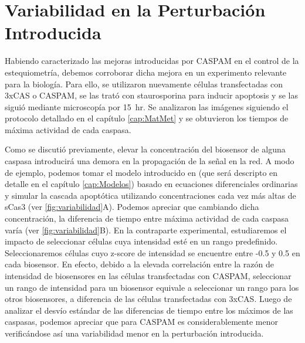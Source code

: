 \section{Variabilidad en la Perturbación Introducida}


Habiendo caracterizado las mejoras introducidas por CASPAM en el control de la estequiometría, debemos corroborar dicha mejora en un experimento relevante para la biología. Para ello, se utilizaron nuevamente células transfectadas con 3xCAS o CASPAM, se las trató con staurosporina para inducir apoptosis y se las siguió mediante microscopía por 15~hr. Se analizaron las imágenes siguiendo el protocolo detallado en el capítulo \ref{cap:MatMet} y se obtuvieron los tiempos de máxima actividad de cada caspasa.

Como se discutió previamente, elevar la concentración del biosensor de alguna caspasa introducirá una demora en la propagación de la señal en la red. A modo de ejemplo, podemos tomar el modelo introducido en \cite{Corbat2018} (que será descripto en detalle en el capítulo \ref{cap:Modelos}) basado en ecuaciones diferenciales ordinarias y simular la cascada apoptótica utilizando concentraciones cada vez más altas de sCas3 (ver \cref{fig:variabilidad}A). Podemos apreciar que cambiando dicha concentración, la diferencia de tiempo entre máxima actividad de cada caspasa varía (ver \cref{fig:variabilidad}B). En la contraparte experimental, estudiaremos el impacto de seleccionar células cuya intensidad esté en un rango predefinido. Seleccionaremos células cuyo z-score de intensidad se encuentre entre -0.5 y 0.5 en cada biosensor. En efecto, debido a la elevada correlación entre la razón de intensidad de biosensores en las células transfectadas con CASPAM, seleccionar un rango de intensidad para un biosensor equivale a seleccionar un rango para los otros biosensores, a diferencia de las células transfectadas con 3xCAS. Luego de analizar el desvío estándar de las diferencias de tiempo entre los máximos de las caspasas, podemos apreciar que para CASPAM es considerablemente menor verificándose así una variabilidad menor en la perturbación introducida.

